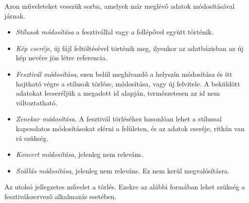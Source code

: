 
Azon műveleteket vesszük sorba, amelyek már meglévő adatok módosításával járnak.

\begin{itemize}

\item \textit{Stílusok módosítása} a fesztivállal vagy a fellépővel együtt történik.

\item \textit{Kép cseréje}, új fájl feltöltésével történik meg, ilyenkor az adatbázisban az új kép nevére jön létre referencia.

\item \textit{Fesztivál módosítása}, ezen belül meghívandó a helyszín módosítása és itt hajtható végre a stílusok törlése, módosítása, vagy új felvitele. A beküldött adatokat lecseréljük a megadott id alapján, természetesen az id nem változtatható.

\item \textit{Zenekar módosítása.} A fesztivál törléséhez hasonlóan lehet a stílussal  kapcsolatos módosításokat elérni a felületen, és az adatok cseréje, ritkán van rá szükség.

\item \textit{Koncert módosítása}, jelenleg nem releváns.

\item \textit{Szállás módosítása}, jelenleg nem releváns. Ez nem kerül megvalósításra.
\end{itemize}


Az utolsó jellegzetes művelet a törlés. Ezekre az alábbi formában lehet szükség a fesztiválszervező alkalmazás esetében.

